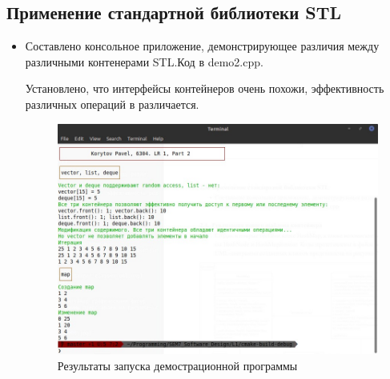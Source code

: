 \documentclass[a4paper, 14pt]{extarticle}
\begin{document}
\subsection{Применение стандартной библиотеки STL}
\begin{itemize}
    \item Составлено консольное приложение, демонстрирующее различия между различными контенерами STL.\@ Код в demo2.cpp.
    
        Установлено, что интерфейсы контейнеров очень похожи, эффективность различных операций в различается.~\cite{cppref}

    \begin{figure}[h]
        \centering
        \includegraphics[width=\textwidth]{./img/S010.jpg}
        \caption{Результаты запуска демострационной программы}%
        \label{img:stl:demo}
    \end{figure}


\end{itemize}
\end{document}
